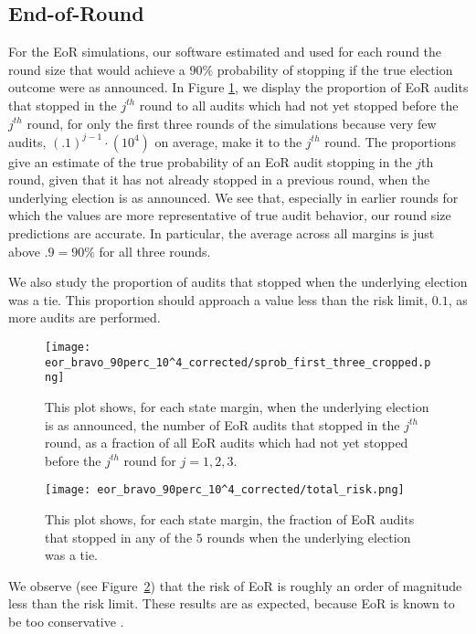 \subsection{End-of-Round \BRAVO}
For the EoR \BRAVO simulations, our software estimated and used for each round
the round size that would achieve a $90\%$ probability of stopping if the true election outcome were as announced. In Figure \ref{fig:eor_bravo_sprob}, we display the proportion of EoR \BRAVO audits that stopped in the $j^{th}$ round
to all audits which had not yet stopped before the $j^{th}$ round, for only the first three rounds of the simulations because very few audits, $(.1)^{j-1}\cdot(10^4)$ on average, 
make it to the $j^{th}$ round. The proportions give an estimate
of the true probability of an EoR \BRAVO audit stopping in the $j$th round,
given that it has not already stopped in a previous round, when the underlying election is as announced. 
We see that, especially in earlier rounds for which 
the values are more representative of true audit behavior, 
our round size predictions are accurate.
In particular, the average across all margins is just above $.9=90\%$ for
all three rounds.

We also study the proportion of audits that stopped when the underlying election was a tie.
This proportion should approach a value less than the risk limit, $0.1$, as more audits are performed.

\begin{figure}
\texttt{[image: eor\_bravo\_90perc\_10^4\_corrected/sprob\_first\_three\_cropped.png]}\caption{
This plot shows, for each state margin, when the underlying election is as announced, the number of EoR \BRAVO audits that stopped in the $j^{th}$ round,
as a fraction of all EoR \BRAVO audits which had not yet stopped before the $j^{th}$ round for $j=1,2,3$.}
\label{fig:eor_bravo_sprob}
\end{figure}

\begin{figure}
\texttt{[image: eor\_bravo\_90perc\_10^4\_corrected/total\_risk.png]}
\caption{This plot shows, for each state margin,
the fraction of EoR \BRAVO audits that stopped in any of the $5$ rounds when the underlying election was a tie.}
\label{fig:eor_bravo_risk}
\end{figure}

We observe (see Figure~\ref{fig:eor_bravo_risk}) that the risk of EoR \BRAVO is roughly
an order of magnitude less than the risk limit. 
These results are as expected, because EoR \BRAVO is known to be too conservative \cite{usenix_minerva}.  

